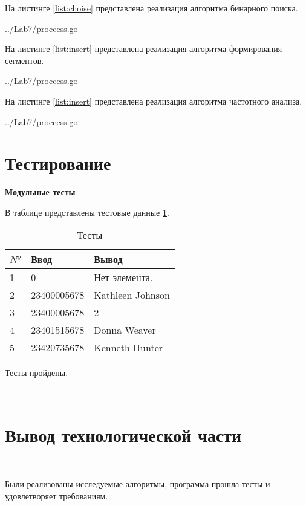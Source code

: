 На листинге \ref{list:choise} представлена реализация алгоритма бинарного поиска.

\begin{lstinputlisting}
    [caption = {Реализация алгоритма бинарного поиска},
    label = {list:choise},
    linerange={18-29},
    ]{../Lab7/proccess.go}
\end{lstinputlisting}

На листинге \ref{list:insert} представлена реализация алгоритма формирования сегментов.

\begin{lstinputlisting}
    [caption = {Реализация алгоритма формирования сегментов},
    label = {list:insert},
    linerange={31-41},
    ]{../Lab7/proccess.go}
\end{lstinputlisting}

На листинге \ref{list:insert} представлена реализация алгоритма частотного анализа.

\begin{lstinputlisting}
    [caption = {Реализация алгоритма частотного анализа},
    label = {list:insert},
    linerange={43-56},
    ]{../Lab7/proccess.go}
\end{lstinputlisting}

\section{Тестирование}\label{TestResult}


\textbf{Модульные тесты}

В таблице представлены тестовые данные \ref{tab:matrixMultiply}.


\begin{table}[ht]
    \caption{Тесты}
    \centering
\begin{tabular}{ l | l | l }
    ${N^{\underline{o}}}$ & Ввод & Вывод   \\ \hline \hline
    1 &  0   &    Нет элемента.    \\  \hline 
    2 &  23400005678   &    Kathleen Johnson    \\  \hline 
    3 &  23400005678   &    2    \\ \hline 
    4 &  23401515678  &    Donna Weaver    \\  \hline 
    5 &  23420735678  &    Kenneth Hunter    \\  \hline  
\end{tabular}
\label{tab:matrixMultiply}
\end{table}

Тесты пройдены.

~\section{Вывод технологической части}\label{TechResults}~

Были реализованы исследуемые алгоритмы, программа прошла тесты и удовлетворяет требованиям.

